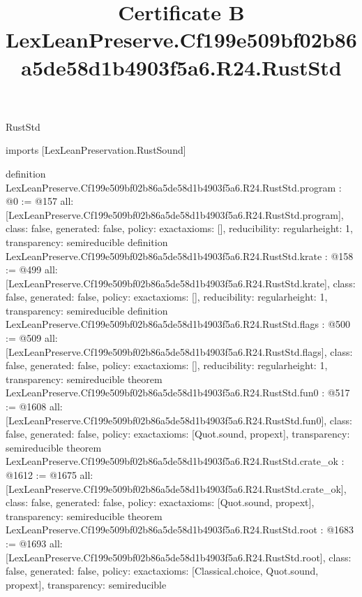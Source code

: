 \begin{lexlean}{RustStd}
\title{Certificate B LexLeanPreserve.Cf199e509bf02b86a5de58d1b4903f5a6.R24.RustStd}
\begin{coremodule}
imports [LexLeanPreservation.RustSound]

definition LexLeanPreserve.Cf199e509bf02b86a5de58d1b4903f5a6.R24.RustStd.program : @0 := @157 {
  all: [LexLeanPreserve.Cf199e509bf02b86a5de58d1b4903f5a6.R24.RustStd.program],
  class: false,
  generated: false,
  policy: exact{axioms: []},
  reducibility: regular{height: 1},
  transparency: semireducible
}
definition LexLeanPreserve.Cf199e509bf02b86a5de58d1b4903f5a6.R24.RustStd.krate : @158 := @499 {
  all: [LexLeanPreserve.Cf199e509bf02b86a5de58d1b4903f5a6.R24.RustStd.krate],
  class: false,
  generated: false,
  policy: exact{axioms: []},
  reducibility: regular{height: 1},
  transparency: semireducible
}
definition LexLeanPreserve.Cf199e509bf02b86a5de58d1b4903f5a6.R24.RustStd.flags : @500 := @509 {
  all: [LexLeanPreserve.Cf199e509bf02b86a5de58d1b4903f5a6.R24.RustStd.flags],
  class: false,
  generated: false,
  policy: exact{axioms: []},
  reducibility: regular{height: 1},
  transparency: semireducible
}
theorem LexLeanPreserve.Cf199e509bf02b86a5de58d1b4903f5a6.R24.RustStd.fun0 : @517 := @1608 {
  all: [LexLeanPreserve.Cf199e509bf02b86a5de58d1b4903f5a6.R24.RustStd.fun0],
  class: false,
  generated: false,
  policy: exact{axioms: [Quot.sound, propext]},
  transparency: semireducible
}
theorem LexLeanPreserve.Cf199e509bf02b86a5de58d1b4903f5a6.R24.RustStd.crate_ok : @1612 := @1675 {
  all: [LexLeanPreserve.Cf199e509bf02b86a5de58d1b4903f5a6.R24.RustStd.crate_ok],
  class: false,
  generated: false,
  policy: exact{axioms: [Quot.sound, propext]},
  transparency: semireducible
}
theorem LexLeanPreserve.Cf199e509bf02b86a5de58d1b4903f5a6.R24.RustStd.root : @1683 := @1693 {
  all: [LexLeanPreserve.Cf199e509bf02b86a5de58d1b4903f5a6.R24.RustStd.root],
  class: false,
  generated: false,
  policy: exact{axioms: [Classical.choice, Quot.sound, propext]},
  transparency: semireducible
}


\end{coremodule}
\end{lexlean}

